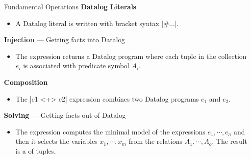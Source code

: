 \begin{frame}[fragile]{Fundamental Operations}
\textbf{Datalog Literals}
\begin{itemize}
    \small
    \item A Datalog literal is written with bracket syntax \Code|#{...}|.
\end{itemize}

\textbf{Injection} --- Getting facts into Datalog
\begin{itemize}
    \small
    \item The  expression returns a
    Datalog program where each tuple in the collection $e_i$ is associated with
    predicate symbol $A_i$.
\end{itemize}

\textbf{Composition}
\begin{itemize}
    \small
    \item The \Code|e1 <+> e2| expression combines two Datalog programs $e_1$
    and $e_2$.
\end{itemize}

\textbf{Solving} --- Getting facts out of Datalog
\begin{itemize}
    \small
    \item The 
    expression computes the minimal model of the expressions $e_1, \cdots, e_n$
    and then it selects the variables $x_1, \cdots, x_m$ from the relations
    $A_1, \cdots, A_o$. The result is a  of tuples.
\end{itemize}
\end{frame}


